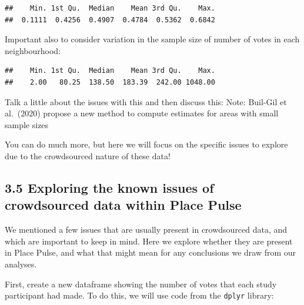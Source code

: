 \documentclass[
]{article}
\newenvironment{Shaded}{\begin{snugshade}}{\end{snugshade}}
\newcommand{\DataTypeTok}[1]{\textcolor[rgb]{0.13,0.29,0.53}{#1}}
\newcommand{\KeywordTok}[1]{\textcolor[rgb]{0.13,0.29,0.53}{\textbf{#1}}}
\newcommand{\NormalTok}[1]{#1}
\newcommand{\OperatorTok}[1]{\textcolor[rgb]{0.81,0.36,0.00}{\textbf{#1}}}
\newcommand{\StringTok}[1]{\textcolor[rgb]{0.31,0.60,0.02}{#1}}
\begin{document}
\begin{verbatim}
##    Min. 1st Qu.  Median    Mean 3rd Qu.    Max. 
##  0.1111  0.4256  0.4907  0.4784  0.5362  0.6842
\end{verbatim}

Important also to consider variation in the sample size of number of
votes in each neighbourhood:

\begin{Shaded}
\end{Shaded}

\begin{verbatim}
##    Min. 1st Qu.  Median    Mean 3rd Qu.    Max. 
##    2.00   80.25  138.50  183.39  242.00 1048.00
\end{verbatim}

Talk a little about the issues with this and then discuss this: Note:
Buil-Gil et al.~(2020) propose a new method to compute estimates for
areas with small sample sizes

You can do much more, but here we will focus on the specific issues to
explore due to the crowdsourced nature of these data!

\hypertarget{exploring-the-known-issues-of-crowdsourced-data-within-place-pulse}{%
\subsection{3.5 Exploring the known issues of crowdsourced data within
Place
Pulse}\label{exploring-the-known-issues-of-crowdsourced-data-within-place-pulse}}

We mentioned a few issues that are usually present in crowdsourced data,
and which are important to keep in mind. Here we explore whether they
are present in Place Pulse, and what that might mean for any conclusions
we draw from our analyses.

First, create a new dataframe showing the number of votes that each
study participant had made. To do this, we will use code from the
\texttt{dplyr} library:

\begin{Shaded}
\end{Shaded}
\end{document}
